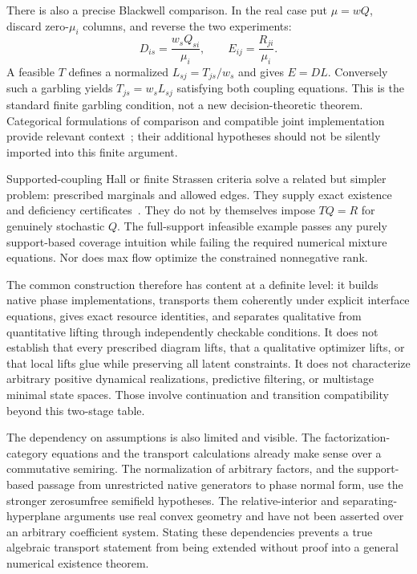 \documentclass[11pt]{article}
\theoremstyle{remark}
\begin{document}
There is also a precise Blackwell comparison. In the real case put $\mu=wQ$, discard zero-$\mu_i$ columns, and reverse the two experiments:
\[
 D_{is}=\frac{w_sQ_{si}}{\mu_i},\qquad
 E_{ij}=\frac{R_{ji}}{\mu_i}.
\]
A feasible $T$ defines a normalized $L_{sj}=T_{js}/w_s$ and gives $E=DL$. Conversely such a garbling yields $T_{js}=w_sL_{sj}$ satisfying both coupling equations. This is the standard finite garbling condition, not a new decision-theoretic theorem. Categorical formulations of comparison and compatible joint implementation provide relevant context~\cite{Fritz2020}; their additional hypotheses should not be silently imported into this finite argument.

Supported-coupling Hall or finite Strassen criteria solve a related but simpler problem: prescribed marginals and allowed edges. They supply exact existence and deficiency certificates~\cite{Koperberg2022}. They do not by themselves impose $TQ=R$ for genuinely stochastic $Q$. The full-support infeasible example passes any purely support-based coverage intuition while failing the required numerical mixture equations. Nor does max flow optimize the constrained nonnegative rank.

The common construction therefore has content at a definite level: it builds native phase implementations, transports them coherently under explicit interface equations, gives exact resource identities, and separates qualitative from quantitative lifting through independently checkable conditions. It does not establish that every prescribed diagram lifts, that a qualitative optimizer lifts, or that local lifts glue while preserving all latent constraints. It does not characterize arbitrary positive dynamical realizations, predictive filtering, or multistage minimal state spaces. Those involve continuation and transition compatibility beyond this two-stage table.

The dependency on assumptions is also limited and visible. The factorization-category equations and the transport calculations already make sense over a commutative semiring. The normalization of arbitrary factors, and the support-based passage from unrestricted native generators to phase normal form, use the stronger zerosumfree semifield hypotheses. The relative-interior and separating-hyperplane arguments use real convex geometry and have not been asserted over an arbitrary coefficient system. Stating these dependencies prevents a true algebraic transport statement from being extended without proof into a general numerical existence theorem.
\end{document}
